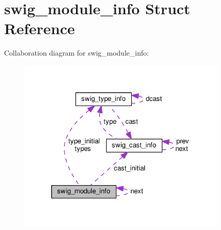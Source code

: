 \hypertarget{structswig__module__info}{}\section{swig\+\_\+module\+\_\+info Struct Reference}
\label{structswig__module__info}


Collaboration diagram for swig\+\_\+module\+\_\+info\+:\nopagebreak
\begin{figure}[H]
\begin{center}
\leavevmode
\includegraphics[width=283pt]{structswig__module__info__coll__graph}
\end{center}
\end{figure}
